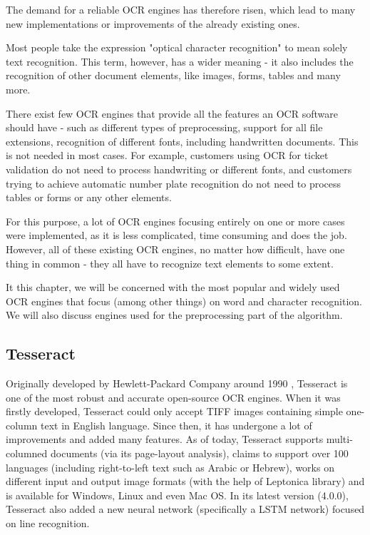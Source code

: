  The demand for a reliable OCR engines has therefore risen, which lead to many new implementations or improvements of the already existing ones.

Most people take the expression "optical character recognition" to mean solely text recognition. This term, however, has a wider meaning - it also includes the recognition of other document elements, like images, forms, tables and many more.

There exist few OCR engines that provide all the features an OCR software should have - such as different types of preprocessing, support for all file extensions, recognition of different fonts, including handwritten documents. This is not needed in most cases. For example, customers using OCR for ticket validation do not need to process handwriting or different fonts, and customers trying to achieve automatic number plate recognition do not need to process tables or forms or any other elements.

For this purpose, a lot of OCR engines focusing entirely on one or more cases were implemented, as it is less complicated, time consuming and does the job. However, all of these existing OCR engines, no matter how difficult, have one thing in common - they all have to recognize text elements to some extent.

It this chapter, we will be concerned with the most popular and widely used OCR engines that focus (among other things) on word and character recognition. We will also discuss engines used for the preprocessing part of the algorithm.

\subsection{Tesseract}

Originally developed by Hewlett-Packard Company around 1990 \citep{TesseractGIT}, Tesseract is one of the most robust and accurate open-source OCR engines. When it was firstly developed, Tesseract could only accept TIFF images containing simple one-column text in English language. Since then, it has undergone a lot of improvements and added many features. As of today, Tesseract supports multi-columned documents (via its page-layout analysis), claims to support over 100 languages (including right-to-left text such as Arabic or Hebrew), works on different input and output image formats (with the help of Leptonica \citep{LeptonicaLIB} library) and is available for Windows, Linux and even Mac OS. In its latest version (4.0.0), Tesseract also added a new neural network (specifically a LSTM network) focused on line recognition. 

